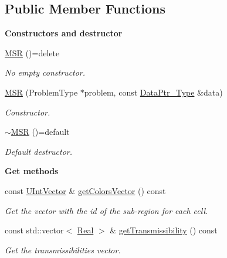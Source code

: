 \subsection*{Public Member Functions}
\begin{Indent}{\bf Constructors and destructor}\par
\begin{DoxyCompactItemize}
\item 
\hyperlink{classFVCode3D_1_1MSR_afde22943dde9de3aa2f2eec71207201f}{M\+SR} ()=delete
\begin{DoxyCompactList}\small\item\em No empty constructor. \end{DoxyCompactList}\item 
\hyperlink{classFVCode3D_1_1MSR_adf51f6d947efdd20fc55e28e32f03178}{M\+SR} (Problem\+Type $\ast$problem, const \hyperlink{namespaceFVCode3D_a3d19a370a98afe491a9e17a646a9c56f}{Data\+Ptr\+\_\+\+Type} \&data)
\begin{DoxyCompactList}\small\item\em Constructor. \end{DoxyCompactList}\item 
\hyperlink{classFVCode3D_1_1MSR_ae08f2baa5cdfc35c42b2617b9308b09f}{$\sim$\+M\+SR} ()=default
\begin{DoxyCompactList}\small\item\em Default destructor. \end{DoxyCompactList}\end{DoxyCompactItemize}
\end{Indent}
\begin{Indent}{\bf Get methods}\par
\begin{DoxyCompactItemize}
\item 
const \hyperlink{namespaceFVCode3D_a9c3dcef0872c1dbd4aaf770d08421fd7}{U\+Int\+Vector} \& \hyperlink{classFVCode3D_1_1MSR_a45eca62b8bdf376a08c668b1535ac275}{get\+Colors\+Vector} () const 
\begin{DoxyCompactList}\small\item\em Get the vector with the id of the sub-\/region for each cell. \end{DoxyCompactList}\item 
const std\+::vector$<$ \hyperlink{namespaceFVCode3D_a40c1f5588a248569d80aa5f867080e83}{Real} $>$ \& \hyperlink{classFVCode3D_1_1MSR_a9ec80ddf6aa0e39f5b7ac338cac71904}{get\+Transmissibility} () const 
\begin{DoxyCompactList}\small\item\em Get the transmissibilities vector. \end{DoxyCompactList}\end{DoxyCompactItemize}
\end{Indent}
